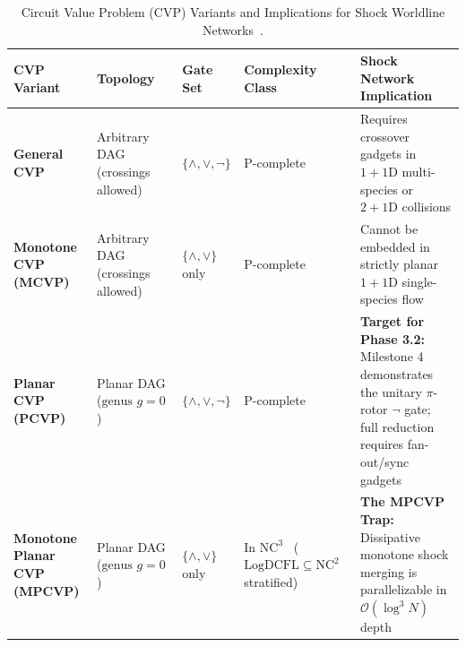 \documentclass[11pt,a4paper]{article}
\theoremstyle{definition}
\begin{document}
\begin{table}[htbp]
\centering
\caption{Circuit Value Problem (CVP) Variants and Implications for Shock Worldline Networks~\cite{goldschlager1977,limaye2009}.}
\label{tab:cvp-variants}
\footnotesize
\begin{tabular}{L{2.8cm}L{2.4cm}L{2.1cm}L{2.6cm}L{3.7cm}}
\toprule
\textbf{CVP Variant} & \textbf{Topology} & \textbf{Gate Set} & \textbf{Complexity Class} & \textbf{Shock Network Implication} \\
\midrule
\textbf{General CVP} & Arbitrary DAG (crossings allowed) & $\{\wedge, \vee, \neg\}$ & $\mathrm{P}$-complete~\cite{goldschlager1977} & Requires crossover gadgets in $1+1\text{D}$ multi-species or $2+1\text{D}$ collisions \\
\addlinespace
\textbf{Monotone CVP (MCVP)} & Arbitrary DAG (crossings allowed) & $\{\wedge, \vee\}$ only & $\mathrm{P}$-complete~\cite{goldschlager1977} & Cannot be embedded in strictly planar $1+1\text{D}$ single-species flow \\
\addlinespace
\textbf{Planar CVP (PCVP)} & Planar DAG ($\text{genus } g = 0$) & $\{\wedge, \vee, \neg\}$ & $\mathrm{P}$-complete~\cite{goldschlager1977} & \textbf{Target for Phase 3.2:} Milestone 4 demonstrates the unitary $\pi$-rotor $\neg$ gate; full reduction requires fan-out/sync gadgets \\
\addlinespace
\textbf{Monotone Planar CVP (MPCVP)} & Planar DAG ($\text{genus } g = 0$) & $\{\wedge, \vee\}$ only & In $\mathrm{NC}^3$~\cite{limaye2009} ($\mathrm{LogDCFL} \subseteq \mathrm{NC}^2$ stratified) & \textbf{The MPCVP Trap:} Dissipative monotone shock merging is parallelizable in $\mathcal{O}(\log^3 N)$ depth \\
\bottomrule
\end{tabular}
\end{table}
\end{document}
